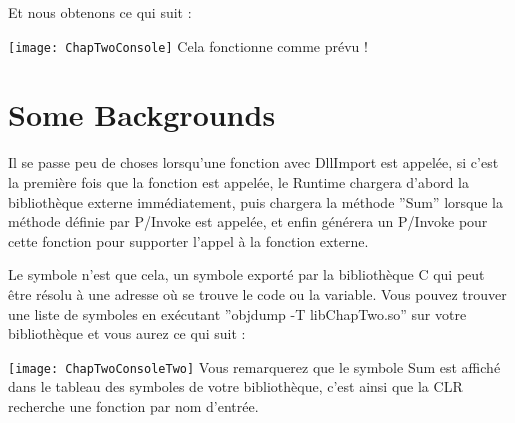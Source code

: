 Et nous obtenons ce qui suit :

\texttt{[image: ChapTwoConsole]}
Cela fonctionne comme prévu !
\newpage
\section{Some Backgrounds}
Il se passe peu de choses lorsqu'une fonction avec DllImport est appelée, si c'est la première fois que la fonction est appelée, le Runtime chargera d'abord la bibliothèque externe immédiatement, puis chargera la méthode ''Sum'' lorsque la méthode définie par P/Invoke est appelée, et enfin générera un P/Invoke pour cette fonction pour supporter l'appel à la fonction externe.

Le symbole n'est que cela, un symbole exporté par la bibliothèque C qui peut être résolu à une adresse où se trouve le code ou la variable. Vous pouvez trouver une liste de symboles en exécutant ''objdump -T libChapTwo.so'' sur votre bibliothèque et vous aurez ce qui suit :

\newline \newline
\texttt{[image: ChapTwoConsoleTwo]}
\newline\newline
Vous remarquerez que le symbole Sum est affiché dans le tableau des symboles de votre bibliothèque, c'est ainsi que la CLR recherche une fonction par nom d'entrée.